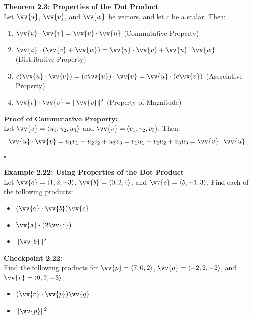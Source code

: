 \documentclass{article}
\begin{document}
\begin{theorembox}
    \textbf{Theorem 2.3: Properties of the Dot Product} \\
    Let \(\vv{u}\), \(\vv{v}\), and \(\vv{w}\) be vectors, and let \(c\) be a scalar. Then:
    \begin{enumerate}
        \item \(\vv{u} \cdot \vv{v} = \vv{v} \cdot \vv{u}\) \quad (Commutative Property)
        \item \(\vv{u} \cdot (\vv{v} + \vv{w}) = \vv{u} \cdot \vv{v} + \vv{u} \cdot \vv{w}\) \quad (Distributive Property)
        \item \(c(\vv{u} \cdot \vv{v}) = (c\vv{u}) \cdot \vv{v} = \vv{u} \cdot (c\vv{v})\) \quad (Associative Property)
        \item \(\vv{v} \cdot \vv{v} = \|\vv{v}\|^2\) \quad (Property of Magnitude)
    \end{enumerate}
\end{theorembox}

\begin{proofbox}
    \textbf{Proof of Commutative Property:} \\
    Let \(\vv{u} = \langle u_1, u_2, u_3 \rangle\) and \(\vv{v} = \langle v_1, v_2, v_3 \rangle\). Then:
    \[
    \vv{u} \cdot \vv{v} = u_1 v_1 + u_2 v_2 + u_3 v_3 = v_1 u_1 + v_2 u_2 + v_3 u_3 = \vv{v} \cdot \vv{u}.
    \]
    \(\square\)
\end{proofbox}

\begin{examplebox}
    \textbf{Example 2.22: Using Properties of the Dot Product} \\
    Let \(\vv{a} = \langle 1, 2, -3 \rangle\), \(\vv{b} = \langle 0, 2, 4 \rangle\), and \(\vv{c} = \langle 5, -1, 3 \rangle\). Find each of the following products:
    \begin{itemize}
        \item \((\vv{a} \cdot \vv{b}) \vv{c}\)
        \item \(\vv{a} \cdot (2\vv{c})\)
        \item \(\|\vv{b}\|^2\)
    \end{itemize}
\end{examplebox}

\begin{exercisebox}
    \textbf{Checkpoint 2.22:} \\
    Find the following products for \(\vv{p} = \langle 7, 0, 2 \rangle\), \(\vv{q} = \langle -2, 2, -2 \rangle\), and \(\vv{r} = \langle 0, 2, -3 \rangle\):
    \begin{itemize}
        \item \((\vv{r} \cdot \vv{p}) \vv{q}\)
        \item \(\|\vv{p}\|^2\)
    \end{itemize}
\end{exercisebox}
\end{document}
